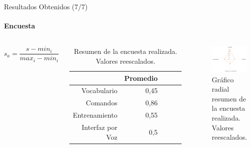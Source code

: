 \begin{frame}{Resultados Obtenidos (7/7)}
\framesubtitle{Encuesta}

\begin{columns}
\begin{equation*}
s_a=\frac{s-min_i}{max_i-min_i}
\end{equation*}

\begin{table}[H] 
\centering
\tiny
\begin{tabular}{|r|r|r|r|r|}
\hline
            & Promedio \\
\hline
Vocabulario    & 0,45 \\
Comandos    & 0,86 \\
Entrenamiento  & 0,55 \\
Interfaz por Voz & 0,5 \\
\hline
\end{tabular}
\caption{Resumen de la encuesta realizada. Valores reescalados.}
\label{sec:tabla-encuesta-normalizada}
\end{table}
\begin{figure}[ht]
\centering
\includegraphics[width=1\linewidth]{./graphics/kiviat.png}
\caption{Gr\'afico radial resumen de la encuesta realizada. Valores reescalados.}
\label{figure:kiviat-encuesta2}
\end{figure}
\end{columns}
\end{frame}